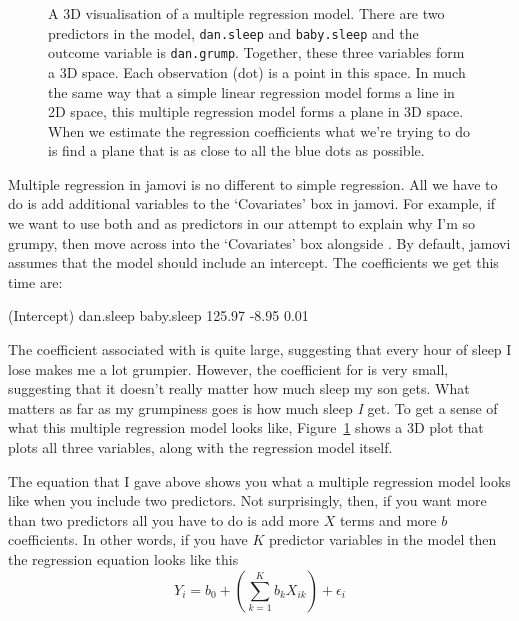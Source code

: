 \begin{figure}[!htb]
\begin{center}
\caption{A 3D visualisation of a multiple regression model. There are two predictors in the model, \texttt{dan.sleep} and \texttt{baby.sleep} and the outcome variable is \texttt{dan.grump}. Together, these three variables form a 3D space. Each observation (dot) is a point in this space. In much the same way that a simple linear regression model forms a line in 2D space, this multiple regression model forms a plane in 3D space. When we estimate the regression coefficients what we're trying to do is find a plane that is as close to all the blue dots as possible.}
\label{fig:multipleregression}
\end{center}
\end{figure}


Multiple regression in jamovi is no different to simple regression. All we have to do is add additional variables to the `Covariates' box in jamovi. For example, if we want to use both  and  as predictors in our attempt to explain why I'm so grumpy, then move  across into the `Covariates' box alongside . By default, jamovi assumes that the model should include an intercept. The coefficients we get this time are:

\begin{rblock1}
(Intercept)    dan.sleep   baby.sleep  
  125.97        -8.95        0.01  
\end{rblock1}

The coefficient associated with  is quite large, suggesting that every hour of sleep I lose makes me a lot grumpier. However, the coefficient for  is very small, suggesting that it doesn't really matter how much sleep my son gets. What matters as far as my grumpiness goes is how much sleep {\it I} get. To get a sense of what this multiple regression model looks like, Figure~\ref{fig:multipleregression} shows a 3D plot that plots all three variables, along with the regression model itself. 

\vspace{0.6cm}
\begin{mdframed}[style=MyFrame,nobreak=true]

The equation that I gave above shows you what a multiple regression model looks like when you include two predictors. Not surprisingly, then, if you want more than two predictors all you have to do is add more $X$ terms and more $b$ coefficients. In other words, if you have $K$ predictor variables in the model then the regression equation looks like this
$$
Y_i = b_0 + \left( \sum_{k=1}^K b_{k} X_{ik} \right) + \epsilon_i
$$
\end{mdframed}

